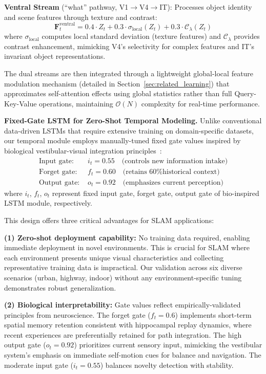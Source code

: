 \textbf{Ventral Stream} (``what'' pathway, V1$\rightarrow$V4$\rightarrow$IT): Processes object identity and scene features through texture and contrast:
\begin{equation}
    \mathbf{F}^{\text{ventral}}_t = 0.4 \cdot Z_t + 0.3 \cdot \sigma_{\text{local}}(Z_t) + 0.3 \cdot \mathcal{C}_\lambda(Z_t)
\end{equation}
where $\sigma_{\text{local}}$ computes local standard deviation (texture features) and $\mathcal{C}_\lambda$ provides contrast enhancement, mimicking V4's selectivity for complex features and IT's invariant object representations.

The dual streams are then integrated through a lightweight global-local feature modulation mechanism (detailed in Section~\ref{sec:related_learning}) that approximates self-attention effects using global statistics rather than full Query-Key-Value operations, maintaining $\mathcal{O}(N)$ complexity for real-time per\-for\-mance.

\textbf{Fixed-Gate LSTM for Zero-Shot Temporal Modeling.}
Unlike conventional data-driven LSTMs that require extensive training on do\-main-spe\-cif\-ic datasets, our temporal module employs manually-tuned fixed gate values inspired by biological ves\-tib\-u\-lar-visual integration principles~\cite{Angelaki2004, Cullen2012}:
\begin{align}
    \text{Input gate: }  & i_t = 0.55 \quad \text{(controls new information intake)} \\
    \text{Forget gate: } & f_t = 0.60 \quad \text{(retains 60\% historical context)} \\
    \text{Output gate: } & o_t = 0.92 \quad \text{(emphasizes current perception)}
\end{align}
where $i_t$, $f_t$, $o_t$ represent fixed input gate, forget gate, output gate of bio-inspired LSTM module, respectively.


This design offers three critical advantages for SLAM applications:

\textbf{(1) Zero-shot deployment capability:} No training data required, enabling immediate deployment in novel environments. This is crucial for SLAM where each environment presents unique visual characteristics and collecting representative training data is impractical. Our validation across six diverse scenarios (urban, highway, indoor) without any environment-specific tuning demonstrates robust generalization.

\textbf{(2) Biological interpretability:} Gate values reflect em\-pir\-i\-cal\-ly-val\-i\-dat\-ed principles from neuroscience. The forget gate ($f_t=0.6$) implements short-term spatial memory retention consistent with hippocampal replay dynamics, where recent experiences are preferentially retained for path integration. The high output gate ($o_t=0.92$) prioritizes current sensory input, mimicking the ves\-tib\-u\-lar system's emphasis on immediate self-motion cues for balance and navigation. The moderate input gate ($i_t=0.55$) balances novelty detection with stability.

